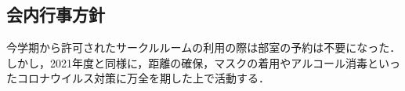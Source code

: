 \subsection*{会内行事方針}


今学期から許可されたサークルルームの利用の際は部室の予約は不要になった．しかし，2021年度と同様に，距離の確保，マスクの着用やアルコール消毒といったコロナウイルス対策に万全を期した上で活動する．
